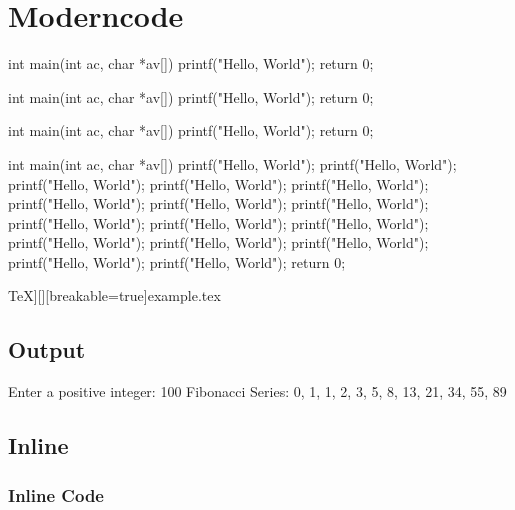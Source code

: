 \documentclass[10pt]{article}
\begin{document}
\section{Moderncode}

\begin{moderncode}[C][][adjusted title={Title}]
int main(int ac, char *av[])
{
	printf("Hello, World");
	return 0;
}
\end{moderncode}

\begin{moderncode}[C][][adjusted title={This title is very very very very very very very very very long}]
int main(int ac, char *av[])
{
	printf("Hello, World");
	return 0;
}
\end{moderncode}

\begin{moderncode}[C]
int main(int ac, char *av[])
{
	printf("Hello, World");
	return 0;
}
\end{moderncode}

\begin{moderncode}[C][][adjusted title={This is a very long code}]
int main(int ac, char *av[])
{
	printf("Hello, World");
	printf("Hello, World");
	printf("Hello, World");
	printf("Hello, World");
	printf("Hello, World");
	printf("Hello, World");
	printf("Hello, World");
	printf("Hello, World");
	printf("Hello, World");
	printf("Hello, World");
	printf("Hello, World");
	printf("Hello, World");
	printf("Hello, World");
	printf("Hello, World");
	printf("Hello, World");
	printf("Hello, World");
	return 0;
}
\end{moderncode}

\moderncodeinput[[LaTeX]TeX][][breakable=true]{example.tex}

\subsection{Output}

\begin{moderncodeout}
Enter a positive integer: 100
Fibonacci Series: 0, 1, 1, 2, 3, 5, 8, 13, 21, 34, 55, 89
\end{moderncodeout}

\subsection{Inline}

\subsubsection{Inline Code}
\end{document}
